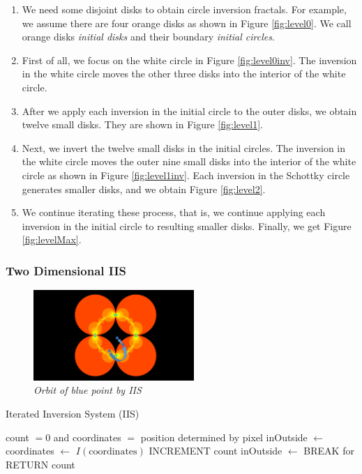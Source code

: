 \begin{enumerate}
 \item We need some disjoint disks to obtain circle inversion fractals.
       For example, we assume there are four orange disks as shown in
       Figure \ref{fig:level0}. We call orange disks \textit{initial
       disks} and their boundary \textit{initial circles}.
 \item First of all, we focus on the white circle in Figure
       \ref{fig:level0inv}. The inversion in the white circle moves the
       other three disks into the interior of the white circle.
 \item After we apply each inversion in the initial circle to the outer disks,
       we obtain twelve small disks. They are shown in Figure \ref{fig:level1}.
 \item Next, we invert the twelve small disks in the initial circles.
       The inversion in the white circle moves the outer nine small disks
       into the interior of the white circle as shown in Figure \ref{fig:level1inv}.
       Each inversion in the Schottky circle generates smaller disks, and we
       obtain Figure \ref{fig:level2}.
 \item We continue iterating these process, that is, we continue
       applying each inversion in the initial circle to resulting
       smaller disks.
       Finally, we get Figure \ref{fig:levelMax}.
\end{enumerate}

\subsubsection{Two Dimensional IIS}

\begin{figure}[htbp]
  \center
  \includegraphics[height=1.35in, keepaspectratio]{img/preparation/orbIIS.png}
  \caption{\textit{Orbit of blue point by IIS}}
  \label{fig:iisOrbit}
 \hspace*{\fill}
\end{figure}

 \begin{algorithm}
  \caption{Iterated Inversion System (IIS)}
  \label{arg:iis2d}
  \begin{algorithmic}
   \REQUIRE count $= 0$ and coordinates $=$ position determined by
   pixel
   \STATE inOutside $\leftarrow$ \TRUE
   \STATE coordinates $\leftarrow$ $I(\text{coordinates})$
   \STATE INCREMENT count
   \STATE inOutside $\leftarrow$ \FALSE
   \ENDIF
   \ENDFOR
   \STATE BREAK for
   \ENDIF
   \ENDFOR
   \STATE RETURN count
  \end{algorithmic}
 \end{algorithm}

